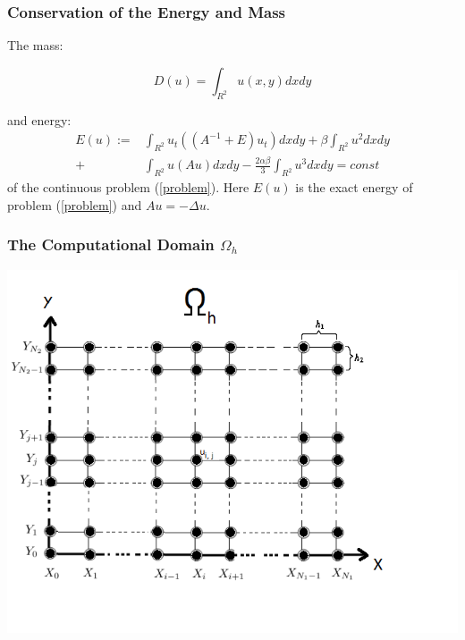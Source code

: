 \documentclass{beamer}
\newcommand{\rf}[1]{(\ref{#1})}
\begin{document}
\begin{frame}
\frametitle{Conservation of the Energy and Mass}
The mass:

\begin{equation}\label{int}
D(u)=\int_{R^2} u(x,y)dx dy
\end{equation}

and energy:
\begin{align}\label{ex-en}
E(u):=&\int_{R^2} u_t \left((A^{-1}+E)u_t\right) dxdy+
\beta \int_{R^2} u^2 dxdy \nonumber\\
+& \int_{R^2}u \left(A u\right) dxdy
-\frac{2 \alpha \beta}{3} \int_{R^2} u^3 dxdy =const
\end{align}
of the continuous problem \rf{problem}. Here $E(u)$ is the exact energy of problem \rf{problem} and $Au=-\Delta u$.
\end{frame}


\begin{frame}
\frametitle{The Computational Domain $\Omega_h$}

\begin{center}\vspace{0.4cm}
	\begin{minipage}[b]{0.6\linewidth}
		\includegraphics[width=\linewidth]{Omega_dah.png}
	\end{minipage}
\end{center}

\end{frame}
\end{document}
